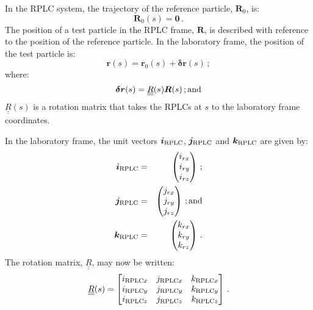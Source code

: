 In the RPLC system, the trajectory of the reference particle,
$\bm{R}_0$, is:
\begin{equation}
  \bm{R}_0(s) = \bm{0}\,.
\end{equation}
The position of a test particle in the RPLC frame, $\bm{R}$, is
described with reference to the position of the reference particle.
In the laboratory frame, the position of the test particle is:
\begin{equation}
  \bm{r}(s) = \bm{r}_0(s) + \bm{\delta r}(s) \,;
\end{equation}
where:
\begin{equation}
  \bm{\delta r}(s) = \underline{\underline{R}}(s) \bm{R}(s) \,{\rm ; and}
\end{equation}
$\underline{\underline{R}}(s)$ is a rotation matrix that takes
the RPLCs at $s$ to the laboratory frame coordinates.

In the laboratory frame, the unit vectors $\bm{i}_{\rm RPLC}$,
$\bm{j}_{\rm RPLC}$ and $\bm{k}_{\rm RPLC}$ are given by:
\begin{eqnarray}
  \bm{i}_{\rm RPLC} & = & \begin{pmatrix} i_{rx} \\ i_{ry} \\  i_{rz} \\ \end{pmatrix} \,;           \nonumber \\
  \bm{j}_{\rm RPLC} & = & \begin{pmatrix} j_{rx} \\ j_{ry} \\  j_{rz} \\ \end{pmatrix} \,{\rm ; and}           \\
  \bm{k}_{\rm RPLC} & = & \begin{pmatrix} k_{rx} \\ k_{ry} \\  k_{rz} \\ \end{pmatrix} \,.           \nonumber
\end{eqnarray}
The rotation matrix, $\underline{\underline{R}}$, may now be written:
\begin{equation}
  \underline{\underline{R}}(s) =
    \begin{bmatrix}
      i_{{\rm RPLC}x} & j_{{\rm RPLC}x} & k_{{\rm RPLC}x} \\
      i_{{\rm RPLC}y} & j_{{\rm RPLC}y} & k_{{\rm RPLC}y} \\
      i_{{\rm RPLC}z} & j_{{\rm RPLC}z} & k_{{\rm RPLC}z}
    \end{bmatrix} \,.
\end{equation}
